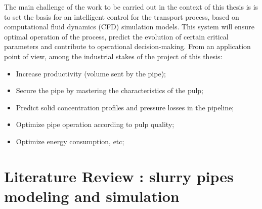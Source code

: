 \documentclass[11pt]{report}
\begin{document}
The main challenge of the work to be carried out in the context of this thesis is is to set the basis for an intelligent control for the transport process, based on computational fluid dynamics (CFD) simulation models.
%
This system will ensure optimal operation of the process, predict the evolution of certain critical parameters and contribute to operational decision-making.
%
From an application point of view, among the industrial stakes of the project of this thesis:
%
\begin{itemize}
\item Increase productivity (volume sent by the pipe);
\item Secure the pipe by mastering the characteristics of the pulp;
\item Predict solid concentration profiles and pressure losses in the pipeline;
\item Optimize pipe operation according to pulp quality;
\item Optimize energy consumption, etc;
\end{itemize}


\chapter{Literature Review : slurry pipes modeling and simulation}
\end{document}
